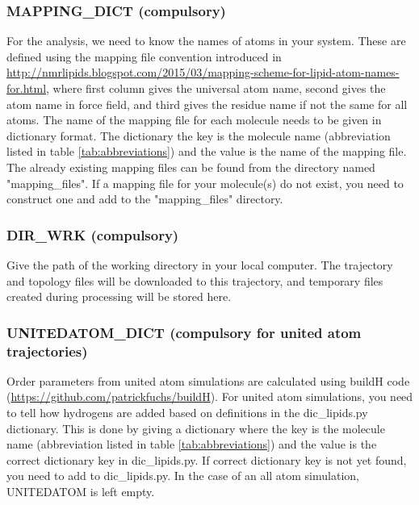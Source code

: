 \documentclass[fleqn,10pt]{wlscirep}
\begin{document}
\subsubsection*{MAPPING\_DICT (compulsory)}
For the analysis, we need to know the names of atoms in your system.
These are defined using the mapping file convention introduced in \url{http://nmrlipids.blogspot.com/2015/03/mapping-scheme-for-lipid-atom-names-for.html}, where first column gives the universal atom name, second gives the atom name in force field, and third gives the residue name if not the same for all atoms.
The name of the mapping file for each molecule needs to be given in dictionary format. The dictionary the key is the molecule name (abbreviation listed in table \ref{tab:abbreviations}) and the value is the name of the mapping file. The already existing mapping files can be found from the directory named "mapping\_files". If a mapping file for your molecule(s) do not exist, you need to construct one and add to the "mapping\_files" directory.


\subsubsection*{DIR\_WRK (compulsory)}
Give the path of the working directory in your local computer. The trajectory and topology files will be downloaded to this trajectory, and temporary files created during processing will be stored here. 


\subsubsection*{UNITEDATOM\_DICT (compulsory for united atom trajectories)}
Order parameters from united atom simulations are calculated using buildH code (\url{https://github.com/patrickfuchs/buildH}). For united atom simulations, you need to tell how hydrogens are added based on definitions in the dic\_lipids.py dictionary. This is done by giving a dictionary where the key is the molecule name (abbreviation listed in table \ref{tab:abbreviations}) and the value is the correct dictionary key in dic\_lipids.py. If correct dictionary key is not yet found, you need to add to dic\_lipids.py. 
In the case of an all atom simulation, UNITEDATOM is left empty.
\end{document}
